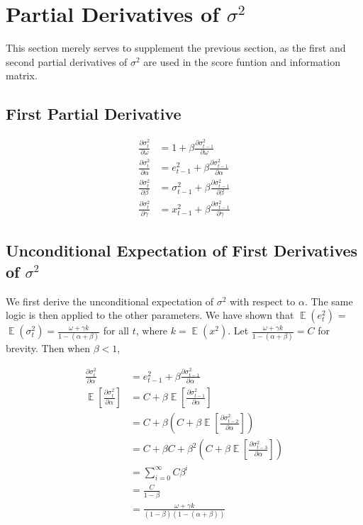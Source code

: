 \documentclass{article}
\DeclareMathOperator{\EX}{\mathbb{E}}%
\begin{document}
\section{Partial Derivatives of $\sigma^2$}
This section merely serves to supplement the previous section, as the first and second partial derivatives of $\sigma^2$ are used in the score funtion and information matrix. 

\subsection{First Partial Derivative}
\begin{align}
    \frac{\partial \sigma_{t}^2}{\partial \omega} &= 1 + \beta \frac{\partial \sigma_{t-1}^2}{\partial \omega} \\
    \frac{\partial \sigma_{t}^2}{\partial \alpha} &= e_{t-1}^2 + \beta \frac{\partial \sigma_{t-1}^2}{\partial \alpha} \\
    \frac{\partial \sigma_{t}^2}{\partial \beta} &= \sigma_{t-1}^2 + \beta \frac{\partial \sigma_{t-1}^2}{\partial \beta} \\
    \frac{\partial \sigma_{t}^2}{\partial \gamma} &= x_{t-1}^2 + \beta \frac{\partial \sigma_{t-1}^2}{\partial \gamma}
\end{align}

\subsection{Unconditional Expectation of First Derivatives of $\sigma^2$}
We first derive the unconditional expectation of $\sigma^2$ with respect to $\alpha$. The same logic is then applied to the other parameters. We have shown that $\EX(e_{t}^2)$ = $\EX(\sigma_{t}^2) = \frac{\omega + \gamma k}{1 - (\alpha+\beta)}$ for all $t$, where $k =\EX(x^2) $. Let $ \frac{\omega + \gamma k}{1 - (\alpha+\beta)} = C $ for brevity.
Then when $\beta < 1$, 

\[
\begin{split}
    \frac{\partial \sigma_{t}^2}{\partial \alpha} &= e_{t-1}^2 + \beta \frac{\partial \sigma_{t-1}^2}{\partial \alpha} \\
    \EX\left[\frac{\partial \sigma_{t}^2}{\partial \alpha}\right] &= C + \beta \EX\left[\frac{\partial \sigma_{t-1}^2}{\partial \alpha}\right]\\
     &= C + \beta \left( C + \beta \EX\left[\frac{\partial \sigma_{t-2}^2}{\partial \alpha}\right] \right) \\
     &= C + \beta C + \beta^2 \left( C + \beta \EX\left[\frac{\partial \sigma_{t-3}^2}{\partial \alpha}\right] \right) \\
     &= \sum_{i=0}^{\infty} C\beta^{i}\\
     &= \frac{C}{1-\beta}\\ 
     &= \frac{\omega + \gamma k}{(1-\beta)(1-(\alpha+\beta))}
\end{split}
\]
\end{document}
